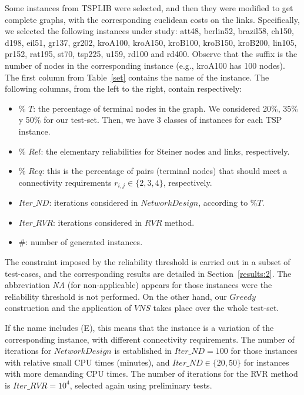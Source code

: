Some instances from TSPLIB were selected, and then they were modified to get complete graphs, with the corresponding euclidean costs on the links. Specifically, we selected the following instances under study: att48, berlin52, brazil58, ch150, d198, eil51, gr137, gr202, kroA100, kroA150, kroB100, kroB150, kroB200, lin105, pr152, rat195, st70,
tsp225, u159, rd100 and rd400. Observe that the suffix is the number of nodes in the corresponding instance (e.g., kroA100 has 100 nodes). 
The first column from Table~\ref{set} contains the name of the instance. The following columns, from the left to the right, contain respectively:
\begin{itemize}
\item \% $T$: the percentage of terminal nodes in the graph. We considered 
20\%, 35\% y 50\% for our test-set. Then, we have 3 classes of instances for each TSP instance. 
\item \% $Rel$: the elementary reliabilities for Steiner nodes and links, respectively.
\item \% $Req$: this is the percentage of pairs (terminal nodes) that should meet a connectivity requirements $r_{i,j}\in \{2,3,4\}$, respectively. 
\item $Iter\_ND$: iterations considered in $NetworkDesign$, according to \%$T$.
\item $Iter\_RVR$: iterations considered in $RVR$ method.
\item \#: number of generated instances.
\end{itemize}

The constraint imposed by the reliability threshold is carried out in a subset of test-cases, and the corresponding results are detailed in Section~\ref{results:2}. The abbreviation \emph{NA} (for non-applicable) appears for those 
instances were the reliability threshold is not performed. On the other hand, our $Greedy$ construction and the application of $VNS$ takes place over the whole test-set. 

If the name includes (E), this means that the instance is a variation of the corresponding instance, with different connectivity requirements. The number of iterations for 
$NetworkDesign$ is established in $Iter\_ND=100$ for those instances with relative small CPU times (minutes), and $Iter\_ND \in \{20,50\}$ for instances with more demanding CPU times. 
The number of iterations for the RVR method is $Iter\_RVR = 10^4$, selected again using preliminary tests.  

